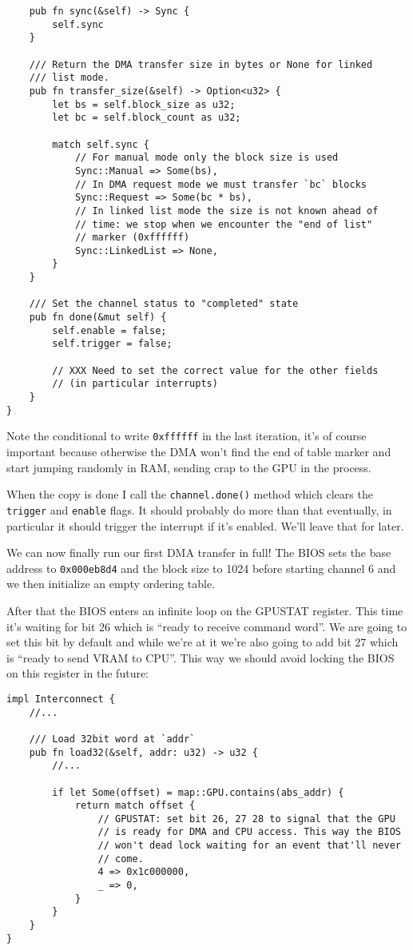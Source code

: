 \documentclass[a4paper]{article}
\newcommand{\code}[1] {\texttt{#1}}
\begin{document}
\begin{lstlisting}
    pub fn sync(&self) -> Sync {
        self.sync
    }

    /// Return the DMA transfer size in bytes or None for linked
    /// list mode.
    pub fn transfer_size(&self) -> Option<u32> {
        let bs = self.block_size as u32;
        let bc = self.block_count as u32;

        match self.sync {
            // For manual mode only the block size is used
            Sync::Manual => Some(bs),
            // In DMA request mode we must transfer `bc` blocks
            Sync::Request => Some(bc * bs),
            // In linked list mode the size is not known ahead of
            // time: we stop when we encounter the "end of list"
            // marker (0xffffff)
            Sync::LinkedList => None,
        }
    }

    /// Set the channel status to "completed" state
    pub fn done(&mut self) {
        self.enable = false;
        self.trigger = false;

        // XXX Need to set the correct value for the other fields
        // (in particular interrupts)
    }
}
\end{lstlisting}

Note the conditional to write \code{0xffffff} in the last iteration,
it's of course important because otherwise the DMA won't find the end
of table marker and start jumping randomly in RAM, sending crap to the
GPU in the process.

When the copy is done I call the \code{channel.done()} method which
clears the \code{trigger} and \code{enable} flags. It should probably
do more than that eventually, in particular it should trigger the
interrupt if it's enabled. We'll leave that for later.

We can now finally run our first DMA transfer in full! The BIOS sets
the base address to \code{0x000eb8d4} and the block size to 1024
before starting channel 6 and we then initialize an empty ordering
table.

After that the BIOS enters an infinite loop on the GPUSTAT
register. This time it's waiting for bit 26 which is ``ready to
receive command word''. We are going to set this bit by default and
while we're at it we're also going to add bit 27 which is ``ready to
send VRAM to CPU''. This way we should avoid locking the BIOS on this
register in the future:

\begin{lstlisting}
impl Interconnect {
    //...

    /// Load 32bit word at `addr`
    pub fn load32(&self, addr: u32) -> u32 {
        //...

        if let Some(offset) = map::GPU.contains(abs_addr) {
            return match offset {
                // GPUSTAT: set bit 26, 27 28 to signal that the GPU
                // is ready for DMA and CPU access. This way the BIOS
                // won't dead lock waiting for an event that'll never
                // come.
                4 => 0x1c000000,
                _ => 0,
            }
        }
    }
}
\end{lstlisting}
\end{document}
